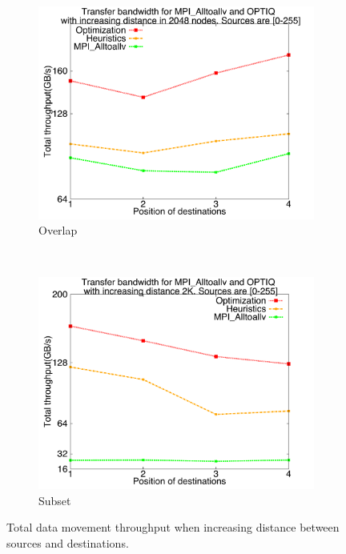 \begin{figure}[!htbp]
\begin{subfigure}[b]{0.32\textwidth}
                \includegraphics[width=\textwidth]{figures/incrdist_overlap}
                \caption{Overlap}
                \label{fig:incrdist_overlap}
        \end{subfigure}
        ~ %
        \begin{subfigure}[b]{0.32\textwidth}
                \includegraphics[width=\textwidth]{figures/incrdist_subset}
                \caption{Subset}
                \label{fig:incrdist_subset}
        \end{subfigure}
        \caption{Total data movement throughput when increasing distance between sources and destinations.}
        \label{fig:incrdist}
\end{figure}

